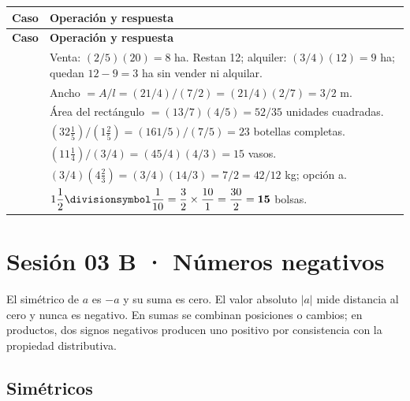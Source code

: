 \documentclass[spanish,letterpaper,oneside]{article}
\let\div\divisionsymbol
\begin{document}
{\small{}\renewcommand{\arraystretch}{1.25}
\begin{longtable}{|>{\raggedright\arraybackslash}p{}|>{\raggedright\arraybackslash}p{}|}\hline
\rowcolor{iiiepePale} \textbf{Caso} & \textbf{Operación y respuesta} \\\hline
\endfirsthead
\hline
\rowcolor{iiiepePale} \textbf{Caso} & \textbf{Operación y respuesta} \\\hline
\endhead
5 & Venta: $(2/5)(20)=8$ ha. Restan 12; alquiler: $(3/4)(12)=9$ ha; quedan $12-9=3$ ha sin vender ni alquilar. \\\hline
6 & Ancho $=A/l=(21/4)/(7/2)=(21/4)(2/7)=3/2$ m. \\\hline
7 & Área del rectángulo $=(13/7)(4/5)=52/35$ unidades cuadradas. \\\hline
8 & $(32\frac15)/(1\frac25)=(161/5)/(7/5)=23$ botellas completas. \\\hline
9 & $(11\frac14)/(3/4)=(45/4)(4/3)=15$ vasos. \\\hline
10 & $(3/4)(4\frac23)=(3/4)(14/3)=7/2=42/12$ kg; opción a. \\\hline
11 & $1\dfrac{1}{2}\div\dfrac{1}{10} = \dfrac{3}{2}\times\dfrac{10}{1} = \dfrac{30}{2} = \mathbf{15}$ bolsas. \\\hline
\end{longtable}}

\section{Sesión 03 B · Números negativos}
El simétrico de $a$ es $-a$ y su suma es cero. El valor absoluto $|a|$ mide distancia al cero y nunca es negativo. En sumas se combinan posiciones o cambios; en productos, dos signos negativos producen uno positivo por consistencia con la propiedad distributiva.
\subsection*{Simétricos}
\end{document}
